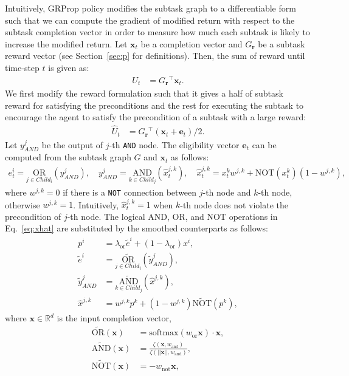 \documentclass{article} \usepackage{iclr2020_conference,times}
\newcommand{\softmax}{\mathrm{softmax}}
\newcommand{\softplus}{\zeta}
\newcommand{\GR}{ G_{\mb{r}} }
\newcommand{\mb}{\mathbf}
\newcommand{\mbb}{\mathbb}
\newcommand{\wt}{\widetilde}
\begin{document}
Intuitively, GRProp policy modifies the subtask graph to a differentiable form such that we can compute the gradient of modified return with respect to the subtask completion vector in order to measure how much each subtask is likely to increase the modified return.
 Let $\mb{x}_t$ be a completion vector and $\GR{}$ be a subtask reward vector (see Section~\ref{sec:p} for definitions). Then, the sum of reward until time-step $t$ is given as:
 \begin{align}
    U_t &= \GR{}^{\top} \mb{x}_{t}. \label{eq:cr}
 \end{align}
We first modify the reward formulation such that it gives a half of subtask reward for satisfying the preconditions and the rest for executing the subtask to encourage the agent to satisfy the precondition of a subtask with a large reward:
 \begin{align}
    \widehat{U}_t &= \GR{}^{\top} (\mb{x}_{t}+\mb{e}_t)/2. \label{eq:cr2}
 \end{align}
Let $y_{AND}^j$ be the output of $j$-th \texttt{AND} node. The eligibility vector $\mathbf{e}_t$ can be computed from the subtask graph $G$ and $\mb{x}_t$ as follows:
\begin{align}
  e_{t}^{i} = \underset{j\in Child_i}{\text{OR}} \left( y^{j}_{AND}\right),\quad
  y^{j}_{AND} = \underset{k\in Child_j}{\text{AND}} \left( \widehat{x}_{t}^{j,k}\right),\quad
  \widehat{x}_{t}^{j,k}= x_t^k w^{j,k} + \text{NOT}(x_t^k)(1-w^{j,k}),
  \label{eq:xhat}
\end{align}
where $w^{j, k}=0$ if there is a \texttt{NOT} connection between $j$-th node and $k$-th node, otherwise $w^{j,k}=1$. Intuitively, $\widehat{x}_{t}^{j,k}=1$ when $k$-th node does not violate the precondition of $j$-th node.
The logical AND, OR, and NOT operations in Eq.~\ref{eq:xhat} are substituted by the smoothed counterparts as follows:
  \begin{align}
 p^{i}&= \lambda_{\text{or}} \wt{e}^{i} + \left( 1 - \lambda_{\text{or}}\right) x^i,\label{eq:soft-progress}\\
 \wt{e}^{i} &= \underset{j\in Child_i}{\wt{\text{OR}}} \left( \wt{y}^{j}_{AND}\right),\\
 \wt{y}^{j}_{AND} &= \underset{k\in Child_j}{\wt{\text{AND}}} \left( \hat{x}^{j,k}\right),\\
 \hat{x}^{j,k}&= w^{j,k} p^k + (1-w^{j,k}) \wt{\text{NOT}} \left(p^k \right),
\end{align}
where $\mb{x}\in\mbb{R}^{d}$ is the input completion vector,
\begin{align}
\wt{\text{OR}} \left( \mb{x} \right) &= \softmax(w_{\text{or}}\mb{x})\cdot \mb{x}, \label{eq:soft-or}\\
\wt{\text{AND}} \left( \mb{x} \right) &= \frac{\softplus(\mb{x}, w_{\text{and}})}{\softplus(||\mb{x}||, w_{\text{and}})} ,\label{eq:soft-and}\\
\wt{\text{NOT}} \left( \mb{x} \right) &= -w_{\text{not}} \mb{x},
\end{align}
\end{document}
